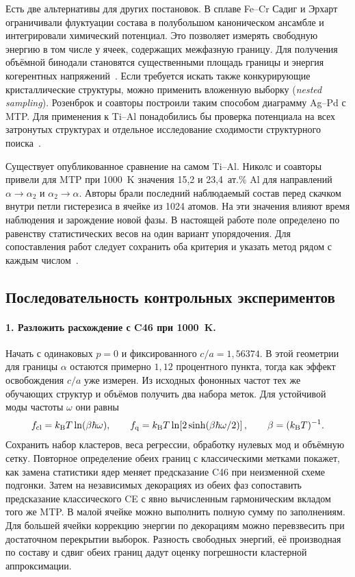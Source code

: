 Есть две альтернативы для других постановок. В сплаве Fe--Cr Садиг и Эрхарт
ограничивали флуктуации состава в полубольшом каноническом ансамбле и
интегрировали химический потенциал. Это позволяет измерять свободную энергию
в том числе у ячеек, содержащих межфазную границу. Для получения объёмной
бинодали становятся существенными площадь границы и энергия когерентных
напряжений~\cite{sadigh2012}. Если требуется искать также конкурирующие
кристаллические структуры, можно применить вложенную выборку
(\emph{nested sampling}). Розенброк и соавторы построили таким способом
диаграмму Ag--Pd с MTP. Для применения к Ti--Al понадобились бы проверка
потенциала на всех затронутых структурах и отдельное исследование
сходимости структурного поиска~\cite{rosenbrock2021}.

Существует опубликованное сравнение на самом Ti--Al. Николс и соавторы
привели для MTP при 1000~K значения 15,2 и 23,4~ат.\% Al
для направлений \(\alpha\to\alpha_2\) и \(\alpha_2\to\alpha\).
Авторы брали последний наблюдаемый состав перед скачком внутри петли
гистерезиса в ячейке из 1024 атомов. На эти значения влияют время
наблюдения и зарождение новой фазы. В настоящей работе поле определено
по равенству статистических весов на один вариант упорядочения.
Для сопоставления работ следует сохранить оба критерия и указать метод
рядом с каждым числом~\cite{nichols2026}.

\subsection{Последовательность контрольных экспериментов}

\paragraph{1. Разложить расхождение с C46 при 1000~K.}
Начать с одинаковых \(p=0\) и фиксированного \(c/a=1{,}56374\).
В этой геометрии для границы \(\alpha\) остаются примерно \(1{,}12\)
процентного пункта, тогда как эффект освобождения \(c/a\) уже измерен.
Из исходных фононных частот тех же обучающих структур и объёмов получить
два набора меток. Для устойчивой моды частоты \(\omega\) они равны
\[
 f_{\rm cl}=k_{\rm B}T\ln(\beta\hbar\omega),\qquad
 f_{\rm q}=k_{\rm B}T\ln\!\left[2\sinh(\beta\hbar\omega/2)\right],
 \qquad \beta=(k_{\rm B}T)^{-1}.
\]
Сохранить набор кластеров, веса регрессии, обработку нулевых мод и
объёмную сетку. Повторное определение обеих границ с классическими
метками покажет, как замена статистики ядер меняет предсказание C46 при
неизменной схеме подгонки. Затем на независимых декорациях из обеих фаз
сопоставить предсказание классического CE с явно вычисленным гармоническим
вкладом того же MTP. В малой ячейке можно выполнить полную сумму по
заполнениям. Для большей ячейки коррекцию энергии по декорациям можно
перевзвесить при достаточном перекрытии выборок. Разность свободных
энергий, её производная по составу и сдвиг обеих границ дадут оценку
погрешности кластерной аппроксимации.

